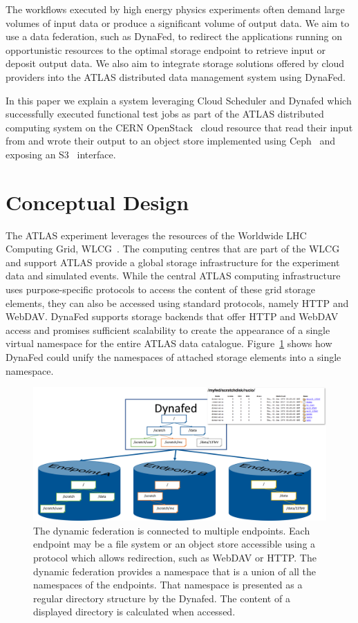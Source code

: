 \documentclass[a4paper]{jpconf}
\begin{document}
The workflows executed by high energy physics experiments often demand large volumes of input data or produce a significant volume of output data. We aim to use a data federation, such as DynaFed, to redirect the applications running on opportunistic resources to the optimal storage endpoint to retrieve input or deposit output data. We also aim to integrate storage solutions offered by cloud providers into the ATLAS distributed data management system using DynaFed.

In this paper we explain a system leveraging Cloud Scheduler and Dynafed which successfully executed functional test jobs as part of the ATLAS distributed computing system on the CERN OpenStack~\cite{openstack} cloud resource that read their input from and wrote their output to an object store implemented using Ceph~\cite{ceph} and exposing an S3~\cite{s3} interface.

\section{Conceptual Design}
The ATLAS experiment leverages the resources of the Worldwide LHC Computing Grid, WLCG~\cite{wlcg}. The computing centres that are part of the WLCG and support ATLAS provide a global storage infrastructure for the experiment data and simulated events. While the central ATLAS computing infrastructure uses purpose-specific protocols to access the content of these grid storage elements, they can also be accessed using standard protocols, namely HTTP and WebDAV. DynaFed supports storage backends that offer HTTP and WebDAV access and promises sufficient scalability to create the appearance of a single virtual namespace for the entire ATLAS data catalogue.  Figure~\ref{fig:conceptual-design} shows how DynaFed could unify the namespaces of attached storage elements into a single namespace.

\begin{figure}
  \centering
  \includegraphics[width=\textwidth]{conceptual-design.png}
  \caption{The dynamic federation is connected to multiple endpoints. Each endpoint may be a file system or an object store accessible using a protocol which allows redirection, such as WebDAV or HTTP. The dynamic federation provides a namespace that is a union of all the namespaces of the endpoints. That namespace is presented as a regular directory structure by the Dynafed. The content of a displayed directory is calculated when accessed.}
  \label{fig:conceptual-design}
\end{figure}
\end{document}
